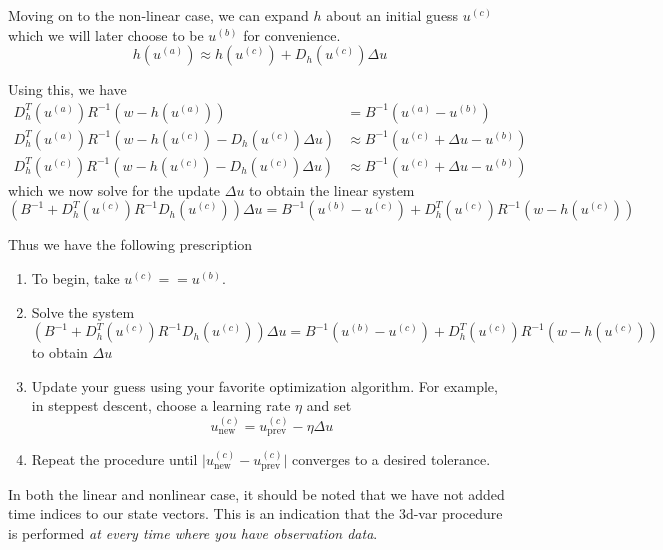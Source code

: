 Moving on to the non-linear case, we can expand $h$ about an initial guess $u^{(c)}$ which we will later choose to be $u^{(b)}$ for convenience.
\begin{equation}
    h(u^{(a)}) \approx h(u^{(c)}) + D_h(u^{(c)})\Delta u
\end{equation}

Using this, we have
\begin{align}
    D_h^T(u^{(a)})R^{-1}(w-h(u^{(a)})) &= B^{-1}(u^{(a)} - u^{(b)}) \\
    D_h^T(u^{(a)})R^{-1}(w-h(u^{(c)})-D_h(u^{(c)})\Delta u) &\approx B^{-1}(u^{(c)} + \Delta u - u^{(b)}) \\
    D_h^T(u^{(c)})R^{-1}(w-h(u^{(c)})-D_h(u^{(c)})\Delta u) &\approx B^{-1}(u^{(c)} + \Delta u - u^{(b)})
\end{align}
which we now solve for the update $\Delta u$ to obtain the linear system
\begin{equation}
    \left(B^{-1} + D_h^T(u^{(c)})R^{-1}D_h(u^{(c)}) \right)\Delta u = B^{-1}(u^{(b)}-u^{(c)}) + D_h^T(u^{(c)})R^{-1}(w-h(u^{(c)}))
\end{equation}

Thus we have the following prescription
\begin{enumerate}
\item To begin, take $u^{(c)} == u^{(b)}$.
\item Solve the system
  \begin{equation}
    \left(B^{-1} + D_h^T(u^{(c)})R^{-1}D_h(u^{(c)}) \right)\Delta u = B^{-1}(u^{(b)}-u^{(c)}) + D_h^T(u^{(c)})R^{-1}(w-h(u^{(c)}))
  \end{equation}
to obtain $\Delta u$
\item Update your guess using your favorite optimization algorithm. For example, in steppest descent, choose a learning rate $\eta$ and set
  \begin{equation}
    u_{\text{new}}^{(c)}  = u_{\text{prev}}^{(c)} - \eta\Delta u
  \end{equation}
\item Repeat the procedure until $\lvert u_{\text{new}}^{(c)} - u_{\text{prev}}^{(c)} \rvert$ converges to a desired tolerance.
\end{enumerate}


In both the linear and nonlinear case, it should be noted that we have not added time indices to our state vectors. This is an indication that the 3d-var procedure is performed \textit{at every time where you have observation data}.


